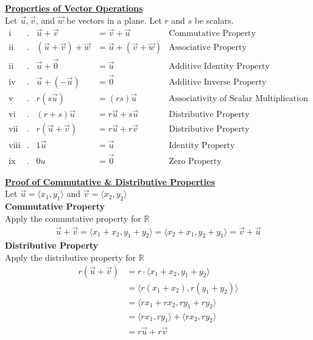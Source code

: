\documentclass[a4paper]{article}
\let\bf\textbf
\let\la\langle
\let\ra\rangle
\begin{document}
\begin{shaded}
    \noindent\underline{\bf{Properties of Vector Operations}}\vspace{2mm}\\
    Let $\vec{u}, \vec{v}$, and $\vec{w}$ be vectors in a plane. Let $r$ and $s$ be scalars.
    \begin{align*}
        \text{i}&. &\vec{u} + \vec{v} &= \vec{v} + \vec{u} &\text{Commutative Property}\\
        \text{ii}&. &(\vec{u} + \vec{v}) + \vec{w} &= \vec{u} + (\vec{v} + \vec{w}) &\text{Associative Property}\\
        \text{ii}&. &\vec{u} + \vec{0} &= \vec{u} &\text{Additive Identity Property}\\
        \text{iv}&. &\vec{u} + (-\vec{u}) &= \vec{0} &\text{Additive Inverse Property}\\
        \text{v}&. &r(s\vec{u}) &= (rs)\vec{u} &\text{Associativity of Scalar Multiplication}\\
        \text{vi}&. &(r + s)\vec{u} &= r\vec{u} + s\vec{u} &\text{Distributive Property}\\
        \text{vii}&. &r(\vec{u} + \vec{v}) &= r\vec{u} + r\vec{v} &\text{Distributive Property}\\
        \text{viii}&. &1\vec{u} &= \vec{u} &\text{Identity Property}\\
        \text{ix}&. &0u &= \vec{0} &\text{Zero Property}
    \end{align*}
\end{shaded}
\begin{shaded}
    \noindent\underline{\bf{Proof of Commutative \& Distributive Properties}}
    \vspace{2mm}\\
    Let $\vec{u} = \la x_1, y_1 \ra$ and $\vec{v} = \la x_2, y_2 \ra$
    \vspace{1mm}\\
    \bf{Commutative Property}
    \vspace{1mm}\\
    Apply the commutative property for $\mathbb{R}$
    \begin{align*}
        \vec{u} + \vec{v} = \la x_1 + x_2, y_1 + y_2 \ra = \la x_2 + x_1, y_2 + y_1 \ra = \vec{v} + \vec{u}
    \end{align*}
    \bf{Distributive Property}
    \vspace{1mm}\\
    Apply the distributive property for $\mathbb{R}$
    \begin{align*}
        r(\vec{u} + \vec{v}) &= r \cdot \la x_1 + x_2, y_1 + y_2 \ra\\
        &= \la r(x_1 + x_2), r(y_1 + y_2) \ra\\
        &= \la rx_1 + rx_2, ry_1 + ry_2 \ra\\
        &= \la rx_1, ry_1 \ra + \la rx_2, ry_2 \ra\\
        &= r\vec{u} + r\vec{v}
    \end{align*}
\end{shaded}
\end{document}
